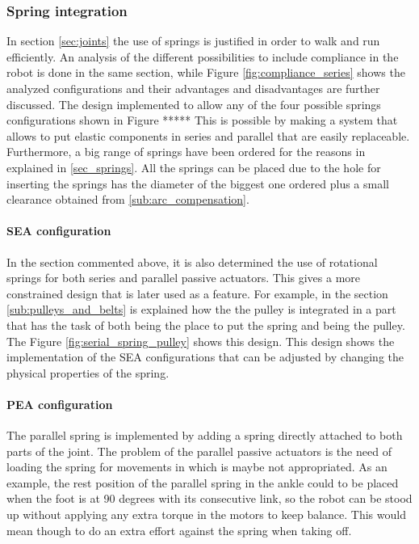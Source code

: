 \subsubsection{Spring integration} %


\label{ssub:spring_integration}
In section \ref{sec:joints} the use of springs is justified in order to walk and run efficiently. 
An analysis of the different possibilities to include compliance in the robot is done in the same section, while Figure \ref{fig:compliance_series} shows the analyzed configurations and their advantages and disadvantages are further discussed.
The design implemented to allow any of the four possible springs configurations shown in Figure *****
This is possible by making a system that allows to put elastic components in series and parallel that are easily replaceable.
Furthermore, a big range of springs have been ordered for the reasons in explained in \ref{sec_springs}.
All the springs can be placed due to the hole for inserting the springs has the diameter of the biggest one ordered plus a small clearance obtained from \ref{sub:arc_compensation}.

\paragraph{SEA configuration} %
\label{para:sea_configuration}

In the section commented above, it is also determined the use of rotational springs for both series and parallel passive actuators.
This gives a more constrained design that is later used as a feature.
For example, in the section \ref{sub:pulleys_and_belts} is explained how the the pulley is integrated in a part that has the task of both being the place to put the spring and being the pulley.
The Figure \ref{fig:serial_spring_pulley} shows this design.
This design shows the implementation of the SEA configurations that can be adjusted by changing the physical properties of the spring.

\paragraph{PEA configuration} %
\label{para:pea_configuration}

The parallel spring is implemented by adding a spring directly attached to both parts of the joint.
The problem of the parallel passive actuators is the need of loading the spring for movements in which is maybe not appropriated.
As an example, the rest position of the parallel spring in the ankle could to be placed when the foot is at 90 degrees with its consecutive link, so the robot can be stood up without applying any extra torque in the motors to keep balance.
This would mean though to do an extra effort against the spring when taking off.

